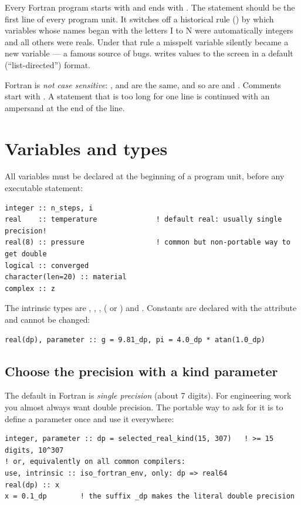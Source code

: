 Every Fortran program starts with  and ends with . The statement  should be the first line of every program unit.
It switches off a historical rule () by which variables whose names
began with the letters I to N were automatically integers and all others were reals. Under
that rule a misspelt variable silently became a new variable --- a famous source of bugs.
 writes values to the screen in a default (``list-directed'') format.

Fortran is \emph{not case sensitive}: ,  and  are the
same, and so are  and . Comments start with \code{!}. A
statement that is too long for one line is continued with an ampersand \code{\&} at the end
of the line.

\section{Variables and types}

All variables must be declared at the beginning of a program unit, before any executable
statement:
\begin{lstlisting}[language={[08]Fortran}]
integer :: n_steps, i
real    :: temperature              ! default real: usually single precision!
real(8) :: pressure                 ! common but non-portable way to get double
logical :: converged
character(len=20) :: material
complex :: z
\end{lstlisting}
The intrinsic types are , , , 
( or ) and . Constants are declared with the
 attribute and cannot be changed:
\begin{lstlisting}[language={[08]Fortran}]
real(dp), parameter :: g = 9.81_dp, pi = 4.0_dp * atan(1.0_dp)
\end{lstlisting}

\subsection*{Choose the precision with a kind parameter}
\label{sec:fortran-kinds}

The default  in Fortran is \emph{single precision} (about 7 digits). For
engineering work you almost always want double precision. The portable way to ask for it
is to define a  parameter once and use it everywhere:
\begin{lstlisting}[language={[08]Fortran}]
integer, parameter :: dp = selected_real_kind(15, 307)   ! >= 15 digits, 10^307
! or, equivalently on all common compilers:
use, intrinsic :: iso_fortran_env, only: dp => real64
real(dp) :: x
x = 0.1_dp        ! the suffix _dp makes the literal double precision
\end{lstlisting}


